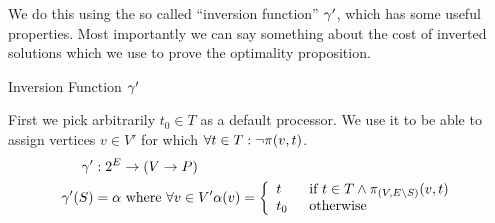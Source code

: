 We do this using the so called ``inversion function'' $\gamma'$, which has some useful properties.
Most importantly we can say something about the cost of inverted solutions which we use to prove the optimality proposition.

\begin{definition}
Inversion Function $\gamma'$

First we pick arbitrarily $t_0 \in T$ as a default processor.
We use it to be able to assign vertices $v \in V'$ for which $\forall t \in T : \neg\pi_{}(v, t)$.
\begin{align}
	\nonumber \gamma' & : 2^E \rightarrow (V \rightarrow P) \\
	\nonumber \gamma'(S) & = \alpha \mbox{ where } \forall v \in V' \alpha(v) = \mbox{$\left\{ 
		\begin{array}{l l}
			t \quad & \mbox{if $t \in T \wedge \pi_{(V,E \setminus S)}(v, t)$}\\
			t_0 & \mbox{otherwise}\\ \end{array} \right.$} 
\end{align}

\end{definition}

